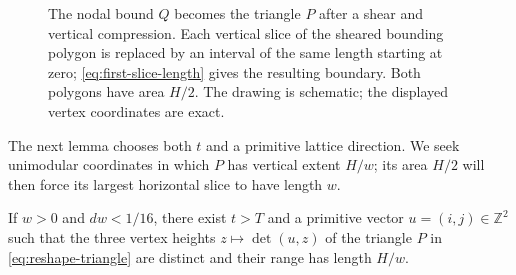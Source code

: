 \begin{figure}[tbp]
\centering
{}
\caption{The nodal bound $Q$ becomes the triangle $P$ after a shear and
vertical compression.  Each vertical slice of the sheared bounding polygon
is replaced by an interval of the same length starting at zero;
\eqref{eq:first-slice-length}
gives the resulting boundary.  Both polygons have area $H/2$.  The drawing
is schematic; the displayed vertex coordinates are exact.}
\label{fig:reshape-polygons}
\end{figure}

The next lemma chooses both $t$ and a primitive lattice direction.  We seek unimodular coordinates in which $P$ has vertical extent $H/w$; its area $H/2$ will then force its largest horizontal slice to have length $w$.

\begin{lemma}\label{lem:primitive-height}
If $w>0$ and $dw<1/16$, there exist $t>T$ and a primitive vector $u=(i,j)\in\mathbb{Z}^2$ such that the three vertex heights $z\mapsto\det(u,z)$ of the triangle $P$ in \eqref{eq:reshape-triangle} are distinct and their range has length $H/w$.
\end{lemma}

